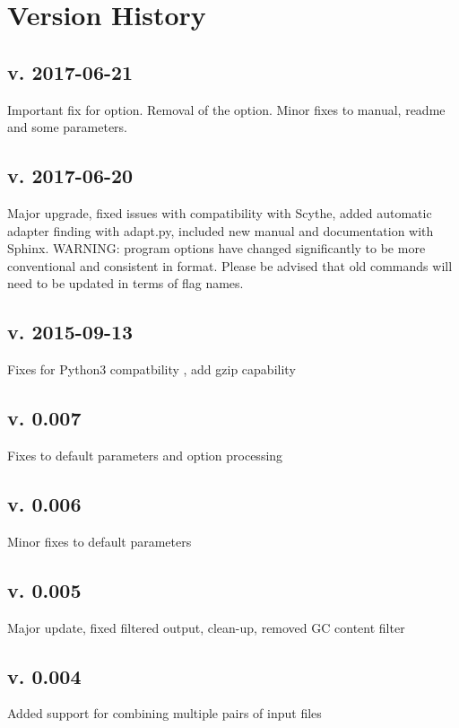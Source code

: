\documentclass[letterpaper,11pt,english]{sphinxmanual}
\begin{document}
\section{Version History}
\label{\detokenize{intro:version-history}}

\subsection{v. 2017-06-21}
\label{\detokenize{intro:v-2017-06-21}}
Important fix for  option. Removal of the  option.
Minor fixes to manual, readme and some parameters.


\subsection{v. 2017-06-20}
\label{\detokenize{intro:v-2017-06-20}}
Major upgrade, fixed issues with compatibility with Scythe,
added automatic adapter finding with adapt.py,
included new manual and documentation with Sphinx.
WARNING: program options have changed significantly to
be more conventional and consistent in format. Please be
advised that old commands will need to be updated in terms
of flag names.


\subsection{v. 2015-09-13}
\label{\detokenize{intro:v-2015-09-13}}
Fixes for Python3 compatbility , add gzip capability


\subsection{v. 0.007}
\label{\detokenize{intro:v-0-007}}
Fixes to default parameters and option processing


\subsection{v. 0.006}
\label{\detokenize{intro:v-0-006}}
Minor fixes to default parameters


\subsection{v. 0.005}
\label{\detokenize{intro:v-0-005}}
Major update, fixed filtered output, clean-up, removed GC content filter


\subsection{v. 0.004}
\label{\detokenize{intro:v-0-004}}
Added support for combining multiple pairs of input files
\end{document}
